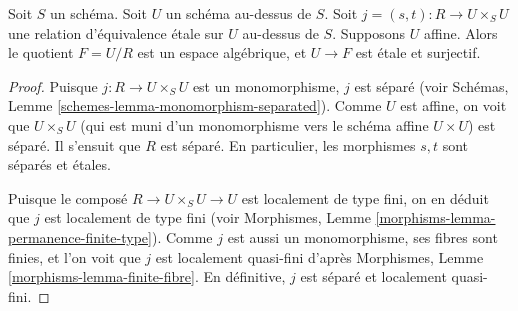 \begin{lemma}
\label{lemma-presentation-quasi-compact}
Soit $S$ un schéma.
Soit $U$ un schéma au-dessus de $S$.
Soit $j = (s, t) : R \to U \times_S U$
une relation d'équivalence \'etale sur $U$ au-dessus de $S$.
Supposons $U$ affine. Alors le quotient $F = U/R$
est un espace algébrique, et $U \to F$ est \'etale et surjectif.
\end{lemma}

\begin{proof}
Puisque $j : R \to U \times_S U$ est un monomorphisme, $j$ est séparé
(voir Schémas, Lemme \ref{schemes-lemma-monomorphism-separated}).
Comme $U$ est affine, on voit que $U \times_S U$
(qui est muni d'un monomorphisme vers le schéma affine
$U \times U$) est séparé. Il s'ensuit que $R$ est séparé.
En particulier, les morphismes $s, t$ sont séparés et \'etales.

\medskip\noindent
Puisque le composé $R \to U \times_S U \to U$ est
localement de type fini, on en déduit que
$j$ est localement de type fini (voir
Morphismes, Lemme \ref{morphisms-lemma-permanence-finite-type}).
Comme $j$ est aussi un monomorphisme, ses fibres sont finies, et
l'on voit que $j$ est localement quasi-fini d'après
Morphismes, Lemme \ref{morphisms-lemma-finite-fibre}.
En définitive, $j$ est séparé et localement quasi-fini.


\end{proof}
